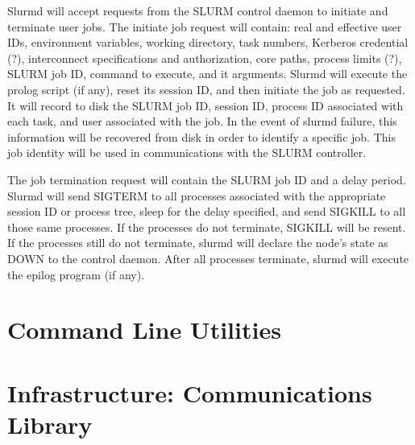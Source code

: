 
Slurmd will accept requests from the SLURM control daemon 
to initiate and terminate user jobs. The initiate 
job request will contain: real and effective user IDs, 
environment variables, working directory, task numbers, 
Kerberos credential (?), interconnect specifications 
and authorization, core paths, process limits (?), SLURM job ID,
command to execute, and it arguments. Slurmd will 
execute the prolog script (if any), reset its session
ID, and then initiate the job as requested. It will 
record to disk the SLURM job ID, session ID, process ID associated 
with each task, and user associated with the job. 
In the event of slurmd failure, this information will 
be recovered from disk in order to identify a specific 
job. This  job identity will be used in communications 
with the SLURM controller.

The job termination request will contain the SLURM job ID and 
a delay period. Slurmd will send SIGTERM to all processes associated 
with the appropriate session ID or process tree, sleep for the 
delay specified, and send SIGKILL to all those same processes. 
If the processes do not terminate, SIGKILL will be resent. 
If the processes still do not terminate, slurmd will declare 
the node's state as DOWN to the control daemon. After all 
processes terminate, slurmd will execute the epilog program 
(if any). 

\section{Command Line Utilities}

\section{Infrastructure: Communications Library}

